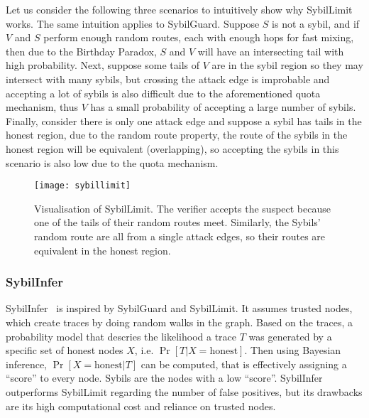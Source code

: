 Let us consider the following three scenarios to intuitively show why SybilLimit
works. The same intuition applies to SybilGuard. Suppose $S$ is not a sybil, and
if $V$ and $S$ perform enough random routes, each with enough hops for fast
mixing, then due to the Birthday Paradox, $S$ and $V$ will have an intersecting
tail with high probability. Next, suppose some tails of $V$ are in the
sybil region so they may intersect with many sybils, but crossing
the attack edge is improbable and accepting a lot of sybils is also difficult
due to the aforementioned quota mechanism, thus $V$ has a small probability of
accepting a large number of sybils. Finally, consider there is only one attack
edge and suppose a sybil has tails in the honest region, due to the random route
property, the route of the sybils in the honest region will be equivalent
(overlapping), so accepting the sybils in this scenario is also low due to the
quota mechanism.

\begin{figure}
  \centering
  \texttt{[image: sybillimit]}
  \caption{Visualisation of SybilLimit. The verifier accepts the suspect because
    one of the tails of their random routes meet. Similarly, the Sybils' random
    route are all from a single attack edges, so their routes are equivalent in
    the honest region.}
  \label{fig:sybillimit}
\end{figure}

\subsubsection{SybilInfer}
SybilInfer~\cite{danezis2009sybilinfer} is inspired by SybilGuard and
SybilLimit. It assumes trusted nodes, which create traces by doing random walks
in the graph. Based on the traces, a probability model that descries the
likelihood a trace $T$ was generated by a specific set of honest nodes $X$, i.e.
$\Pr[ T | X = \text{honest}]$. Then using Bayesian inference, $\Pr[ X =
\text{honest}| T ]$ can be computed, that is effectively assigning a ``score''
to every node. Sybils are the nodes with a low ``score''. SybilInfer outperforms
SybilLimit regarding the number of false positives, but its drawbacks are its
high computational cost and reliance on trusted nodes.

